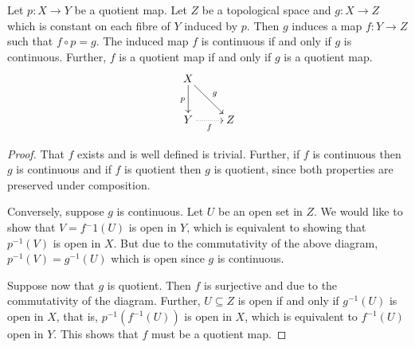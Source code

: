 \begin{theorem}
    Let $p: X\to Y$ be a quotient map. Let $Z$ be a topological space and $g: X\to Z$ which is constant on each fibre of $Y$ induced by $p$. Then $g$ induces a map $f: Y\to Z$ such that $f\circ p = g$. The induced map $f$ is continuous if and only if $g$ is continuous. Further, $f$ is a quotient map if and only if $g$ is a quotient map.
    \begin{equation*}
    \xymatrix {
        X\ar[d]_p\ar[rd]^g\\
        Y\ar@{.>}[r]_f & Z
    }
    \end{equation*}
\end{theorem}
\begin{proof}
    That $f$ exists and is well defined is trivial. Further, if $f$ is continuous then $g$ is continuous and if $f$ is quotient then $g$ is quotient, since both properties are preserved under composition. 

    Conversely, suppose $g$ is continuous. Let $U$ be an open set in $Z$. We would like to show that $V = f{^-1}(U)$ is open in $Y$, which is equivalent to showing that $p^{-1}(V)$ is open in $X$. But due to the commutativity of the above diagram, $p^{-1}(V) = g^{-1}(U)$ which is open since $g$ is continuous.

    Suppose now that $g$ is quotient. Then $f$ is surjective and due to the commutativity of the diagram. Further, $U\subseteq Z$ is open if and only if $g^{-1}(U)$ is open in $X$, that is, $p^{-1}(f^{-1}(U))$ is open in $X$, which is equivalent to $f^{-1}(U)$ open in $Y$. This shows that $f$ must be a quotient map.
\end{proof}

